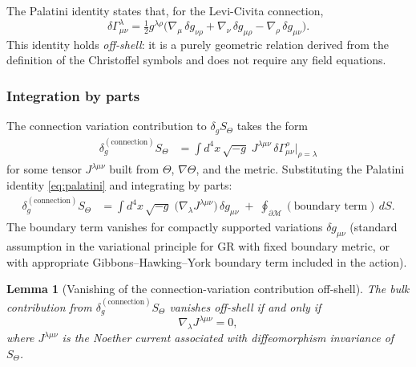 \documentclass[12pt]{article}
\newtheorem{lemma}[theorem]{Lemma}
\theoremstyle{definition}
\theoremstyle{remark}
\begin{document}
The Palatini identity states that, for the Levi-Civita connection,
\begin{equation}
  \delta\Gamma^\lambda_{\mu\nu}
  = \tfrac{1}{2}g^{\lambda\rho}\bigl(\nabla_\mu\,\delta g_{\nu\rho}
    + \nabla_\nu\,\delta g_{\mu\rho} - \nabla_\rho\,\delta g_{\mu\nu}\bigr).
  \label{eq:palatini}
\end{equation}
This identity holds \emph{off-shell}: it is a purely geometric relation derived from
the definition of the Christoffel symbols and does not require any field equations.

\subsubsection{Integration by parts}

The connection variation contribution to $\delta_g S_\Theta$ takes the form
\begin{align}
  \delta_g^{(\text{connection})} S_\Theta
  &= \int d^4x\,\sqrt{-g}\;
     J^{\lambda\mu\nu}\,\delta\Gamma^\rho_{\mu\nu}|_{\rho=\lambda}
  \label{eq:connection_contrib_raw}
\end{align}
for some tensor $J^{\lambda\mu\nu}$ built from $\Theta$, $\nabla\Theta$, and the metric.
Substituting the Palatini identity \eqref{eq:palatini} and integrating by parts:
\begin{align}
  \delta_g^{(\text{connection})} S_\Theta
  &= \int d^4x\,\sqrt{-g}\;
     \bigl(\nabla_\lambda J^{\lambda\mu\nu}\bigr)\,\delta g_{\mu\nu}
  \;+\; \oint_{\partial\mathcal{M}} (\text{boundary term})\,dS.
  \label{eq:ibp_connection}
\end{align}
The boundary term vanishes for compactly supported variations $\delta g_{\mu\nu}$
(standard assumption in the variational principle for GR with fixed boundary metric,
or with appropriate Gibbons--Hawking--York boundary term included in the action).

\begin{lemma}[Vanishing of the connection-variation contribution off-shell]
\label{lem:connection_variation_off_shell}
The bulk contribution from $\delta_g^{(\text{connection})} S_\Theta$ vanishes
\emph{off-shell} if and only if
\begin{equation}
  \nabla_\lambda J^{\lambda\mu\nu} = 0,
  \label{eq:J_divergence}
\end{equation}
where $J^{\lambda\mu\nu}$ is the Noether current associated with diffeomorphism
invariance of $S_\Theta$.
\end{lemma}
\end{document}

